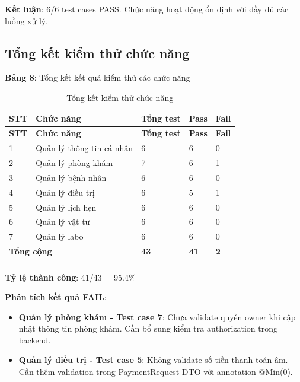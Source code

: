 \textbf{Kết luận}: 6/6 test cases PASS. Chức năng hoạt động ổn định với đầy đủ các luồng xử lý.

\subsection{Tổng kết kiểm thử chức năng}

\textbf{Bảng 8}: Tổng kết kết quả kiểm thử các chức năng

\begin{longtable}{|p{1cm}|p{6cm}|p{2cm}|p{2cm}|p{2cm}|}
\hline
\textbf{STT} & \textbf{Chức năng} & \textbf{Tổng test} & \textbf{Pass} & \textbf{Fail} \\
\hline
\endfirsthead

\hline
\textbf{STT} & \textbf{Chức năng} & \textbf{Tổng test} & \textbf{Pass} & \textbf{Fail} \\
\hline
\endhead

\hline
\endfoot

1 & Quản lý thông tin cá nhân & 6 & 6 & 0 \\
\hline
2 & Quản lý phòng khám & 7 & 6 & 1 \\
\hline
3 & Quản lý bệnh nhân & 6 & 6 & 0 \\
\hline
4 & Quản lý điều trị & 6 & 5 & 1 \\
\hline
5 & Quản lý lịch hẹn & 6 & 6 & 0 \\
\hline
6 & Quản lý vật tư & 6 & 6 & 0 \\
\hline
7 & Quản lý labo & 6 & 6 & 0 \\
\hline
\multicolumn{2}{|l|}{\textbf{Tổng cộng}} & \textbf{43} & \textbf{41} & \textbf{2} \\
\hline
\caption{Tổng kết kiểm thử chức năng}
\end{longtable}

\textbf{Tỷ lệ thành công}: 41/43 = 95.4\%

\textbf{Phân tích kết quả FAIL}:

\begin{itemize}
    \item \textbf{Quản lý phòng khám - Test case 7}: Chưa validate quyền owner khi cập nhật thông tin phòng khám. Cần bổ sung kiểm tra authorization trong backend.
    
    \item \textbf{Quản lý điều trị - Test case 5}: Không validate số tiền thanh toán âm. Cần thêm validation trong PaymentRequest DTO với annotation @Min(0).
\end{itemize}

